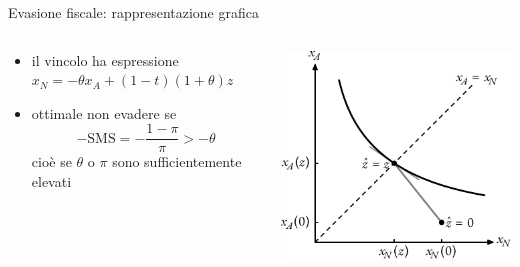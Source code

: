 \documentclass[11pt]{beamer}
\begin{document}
\begin{frame}{Evasione fiscale: rappresentazione grafica}
\begin{columns}
\begin{column}{.45\columnwidth}
\begin{itemize}
\item il vincolo ha espressione $x_N=-\theta x_A+(1-t)(1+\theta)z$
\item ottimale non evadere se
$$ -\text{SMS}=-\frac{1-\pi}{\pi} >-\theta $$
cioè se $\theta$ o $\pi$ sono sufficientemente elevati
\end{itemize}
\end{column}
\begin{column}{.55\columnwidth}
\begin{center}
\includegraphics[width=\textwidth]{./figure/evasione-1.pdf}
\end{center}
\end{column}
\end{columns}
\end{frame}
\end{document}
